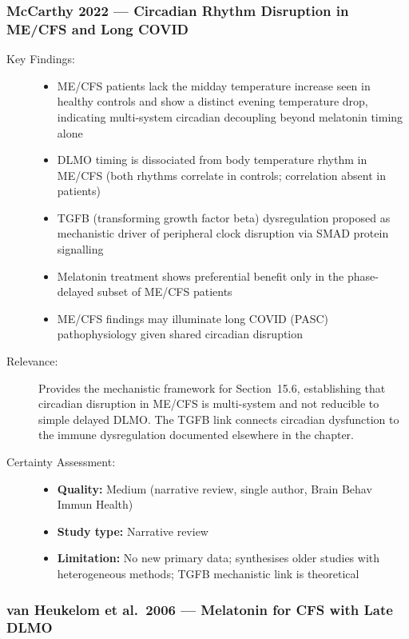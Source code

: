 \subsubsection*{McCarthy 2022 --- Circadian Rhythm Disruption in ME/CFS and Long COVID}


\begin{description}
    \item[Key Findings:]
    \begin{itemize}
        \item ME/CFS patients lack the midday temperature increase seen in healthy controls and show a distinct evening temperature drop, indicating multi-system circadian decoupling beyond melatonin timing alone
        \item DLMO timing is dissociated from body temperature rhythm in ME/CFS (both rhythms correlate in controls; correlation absent in patients)
        \item TGFB (transforming growth factor beta) dysregulation proposed as mechanistic driver of peripheral clock disruption via SMAD protein signalling
        \item Melatonin treatment shows preferential benefit only in the phase-delayed subset of ME/CFS patients
        \item ME/CFS findings may illuminate long COVID (PASC) pathophysiology given shared circadian disruption
    \end{itemize}
    \item[Relevance:] Provides the mechanistic framework for Section~15.6, establishing that circadian disruption in ME/CFS is multi-system and not reducible to simple delayed DLMO. The TGFB link connects circadian dysfunction to the immune dysregulation documented elsewhere in the chapter.
    \item[Certainty Assessment:]
    \begin{itemize}
        \item \textbf{Quality:} Medium (narrative review, single author, Brain Behav Immun Health)
        \item \textbf{Study type:} Narrative review
        \item \textbf{Limitation:} No new primary data; synthesises older studies with heterogeneous methods; TGFB mechanistic link is theoretical
    \end{itemize}
\end{description}

\subsubsection*{van Heukelom et al.\ 2006 --- Melatonin for CFS with Late DLMO}

